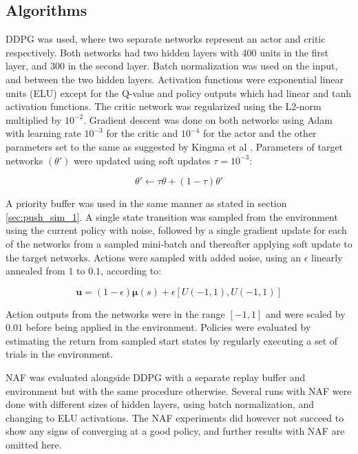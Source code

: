\subsection{Algorithms}

DDPG was used, where two separate networks represent an actor and critic
respectively. Both networks had two hidden layers with 400 units in the first
layer, and 300 in the second layer. Batch normalization was used on the input,
and between the two hidden layers. Activation functions were exponential linear
units (ELU) except for the Q-value and policy outputs which had linear and tanh
activation functions. The critic network was regularized using the L2-norm
multiplied by $10^{-2}$. Gradient descent was done on both networks using Adam
with learning rate $10^{-3}$ for the critic and $10^{-4}$ for the actor and the
other parameters set to the same as suggested by Kingma et al
\cite{kingma2014adam}. Parameters of target networks $(\theta')$ were updated
using soft updates $\tau = 10^{-3}$:

\begin{equation}
    \theta' \leftarrow \tau \theta + (1 - \tau) \theta'
\end{equation}

A priority buffer was used in the same manner as stated in section
\ref{sec:push_sim_1}. A single state transition was sampled from the
environment using the current policy with noise, followed by a single gradient
update for each of the networks from a sampled mini-batch and thereafter
applying soft update to the target networks. Actions were sampled with added
noise, using an $\epsilon$ linearly annealed from $1$ to $0.1$, according to:

\begin{equation}
    \mathbf{u} = (1 - \epsilon) \mathbf{\mu}(s) + \epsilon \left[U(-1, 1), U(-1, 1)\right]
\end{equation}

Action outputs from the networks were in the range $[-1, 1]$ and were scaled by
$0.01$ before being applied in the environment. Policies were evaluated by
estimating the return from sampled start states by regularly executing a set of
trials in the environment.

NAF was evaluated alongside DDPG with a separate replay buffer and environment
but with the same procedure otherwise. Several runs with NAF were done with
different sizes of hidden layers, using batch normalization, and changing to
ELU activations. The NAF experiments did however not succeed to show any signs
of converging at a good policy, and further results with NAF are omitted here.

